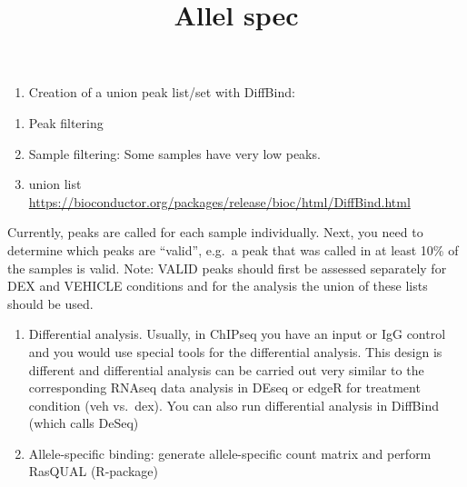 \documentclass[
]{article}
\title{Allel spec}
\author{}
\date{\vspace{-2.5em}}
\providecommand{\tightlist}{%
  \setlength{\itemsep}{0pt}\setlength{\parskip}{0pt}}
\begin{document}
\maketitle

\begin{enumerate}
\def\labelenumi{\arabic{enumi})}
\setcounter{enumi}{2}
\tightlist
\item
  Creation of a union peak list/set with DiffBind:
\end{enumerate}

\begin{enumerate}
\def\labelenumi{\alph{enumi})}
\tightlist
\item
  Peak filtering
\item
  Sample filtering: Some samples have very low peaks.
\item
  union list
  \url{https://bioconductor.org/packages/release/bioc/html/DiffBind.html}
\end{enumerate}

Currently, peaks are called for each sample individually. Next, you need
to determine which peaks are ``valid'', e.g.~a peak that was called in
at least 10\% of the samples is valid. Note: VALID peaks should first be
assessed separately for DEX and VEHICLE conditions and for the analysis
the union of these lists should be used.

\begin{enumerate}
\def\labelenumi{\arabic{enumi})}
\setcounter{enumi}{3}
\item
  Differential analysis. Usually, in ChIPseq you have an input or IgG
  control and you would use special tools for the differential analysis.
  This design is different and differential analysis can be carried out
  very similar to the corresponding RNAseq data analysis in DEseq or
  edgeR for treatment condition (veh vs.~dex). You can also run
  differential analysis in DiffBind (which calls DeSeq)
\item
  Allele-specific binding: generate allele-specific count matrix and
  perform RasQUAL (R-package)
\end{enumerate}
\end{document}
